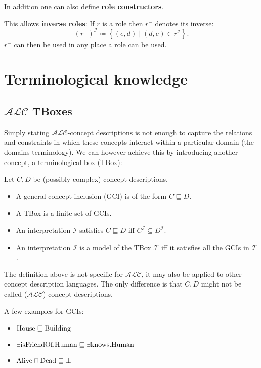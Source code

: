 In addition one can also define \textbf{role constructors}.
\begin{example}
	This allows \textbf{inverse roles}:
	If $r$ is a role then $r^{-}$ denotes its inverse:
	\[
		\left( r^{-} \right) ^{\mathcal{I}} \coloneqq \left\{ (e,d) \mid (d,e) \in r^{\mathcal{I}} \right\} 
	.\] 
	$r^{-}$ can then be used in any place a role can be used.
\end{example}

\newpage
\section{Terminological knowledge}
\subsection{$\mathcal{ALC}$ TBoxes}
Simply stating $\mathcal{ALC}$-concept descriptions is not enough to capture the relations and constraints in which these concepts interact within a particular domain (the domains terminology).
We can however achieve this by introducing another concept, a terminological box (TBox):

\begin{definition}
	Let $C, D$ be (possibly complex) concept descriptions.
	\begin{itemize}
		\item A general concept inclusion (GCI) is of the form $C \sqsubseteq D$.
		\item A TBox is a finite set of GCIs.
		\item An interpretation $\mathcal{I}$ satisfies $C \sqsubseteq D$ iff $C^{\mathcal{I}} \subseteq D^{\mathcal{I}}$.
		\item An interpretation $\mathcal{I}$ is a model of the TBox $\mathcal{T}$ iff it satisfies all the GCIs in $\mathcal{T}$.
	\end{itemize}
\end{definition}

\begin{note}
	The definition above is not specific for $\mathcal{ALC}$, it may also be applied to other concept description languages.
	The only difference is that $C, D$ might not be called ($\mathcal{ALC}$)-concept descriptions.
\end{note}

\begin{example}
	A few examples for GCIs:
	 \begin{itemize}
		 \item $ \var{House} \sqsubseteq \var{Building}$
		\item $\exists \var{isFriendOf}.\var{Human} \sqsubseteq \exists \var{knows}. \var{Human}$
		\item $\var{Alive} \sqcap \var{Dead} \sqsubseteq \bot$ 
	\end{itemize}
\end{example}

